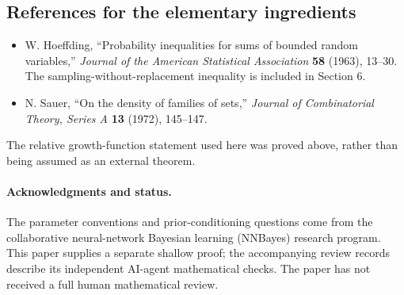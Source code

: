 \documentclass[11pt]{article}
\providecommand{\tightlist}{\setlength{\itemsep}{0pt}\setlength{\parskip}{0pt}}
\begin{document}
\subsection{References for the elementary
ingredients}\label{references-for-the-elementary-ingredients}

\begin{itemize}
\tightlist
\item
  W. Hoeffding, ``Probability inequalities for sums of bounded random
  variables,'' \emph{Journal of the American Statistical Association}
  \textbf{58} (1963), 13--30. The sampling-without-replacement
  inequality is included in Section 6.
\item
  N. Sauer, ``On the density of families of sets,'' \emph{Journal of
  Combinatorial Theory, Series A} \textbf{13} (1972), 145--147.
\end{itemize}

The relative growth-function statement used here was proved above,
rather than being assumed as an external theorem.

\paragraph{Acknowledgments and status.}
The parameter conventions and prior-conditioning questions come from the
collaborative neural-network Bayesian learning (NNBayes) research program.
This paper supplies a separate
shallow proof; the accompanying review records describe its independent
AI-agent mathematical checks. The paper has not received a full human
mathematical review.
\end{document}
